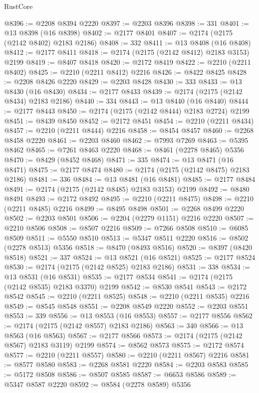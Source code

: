 \begin{lexlean}{RustCore}
\begin{coremodule}
@8396 := @2208 @8394 @2220
@8397 := @2203 @8396
@8398 := 331
@8401 := @13 @8398 (@16 @8398)
@8402 := @2177 @8401
@8407 := @2174 (@2175 (@2142 @8402) @2183 @2186)
@8408 := 332
@8411 := @13 @8408 (@16 @8408)
@8412 := @2177 @8411
@8418 := @2174 (@2175 (@2142 @8412) @2183 @3153) @2199
@8419 := @8407 @8418
@8420 := @2172 @8419
@8422 := @2210 (@2211 @8402)
@8425 := @2210 (@2211 @8412) @2216
@8426 := @8422 @8425
@8428 := @2208 @8426 @2220
@8429 := @2203 @8428
@8430 := 333
@8433 := @13 @8430 (@16 @8430)
@8434 := @2177 @8433
@8439 := @2174 (@2175 (@2142 @8434) @2183 @2186)
@8440 := 334
@8443 := @13 @8440 (@16 @8440)
@8444 := @2177 @8443
@8450 := @2174 (@2175 (@2142 @8444) @2183 @2724) @2199
@8451 := @8439 @8450
@8452 := @2172 @8451
@8454 := @2210 (@2211 @8434)
@8457 := @2210 (@2211 @8444) @2216
@8458 := @8454 @8457
@8460 := @2268 @8458 @2220
@8461 := @2203 @8460
@8462 := @7993 @7269
@8463 := @5395 @8462
@8465 := @7261 @8463 @2220
@8468 := @8461 (@2278 @8465) @5356
@8470 := @8429 (@8452 @8468)
@8471 := 335
@8474 := @13 @8471 (@16 @8471)
@8475 := @2177 @8474
@8480 := @2174 (@2175 (@2142 @8475) @2183 @2186)
@8481 := 336
@8484 := @13 @8481 (@16 @8481)
@8485 := @2177 @8484
@8491 := @2174 (@2175 (@2142 @8485) @2183 @3153) @2199
@8492 := @8480 @8491
@8493 := @2172 @8492
@8495 := @2210 (@2211 @8475)
@8498 := @2210 (@2211 @8485) @2216
@8499 := @8495 @8498
@8501 := @2268 @8499 @2220
@8502 := @2203 @8501
@8506 := @2204 (@2279 @1151) @2216 @2220
@8507 := @2210 @8506
@8508 := @8507 @2216
@8509 := @7266 @8508
@8510 := @6085 @8509
@8511 := @5550 @8510
@8513 := @5347 @8511 @2220
@8516 := @8502 (@2278 @8513) @5356
@8518 := @8470 (@8493 @8516)
@8520 := @8397 (@8420 @8518)
@8521 := 337
@8524 := @13 @8521 (@16 @8521)
@8525 := @2177 @8524
@8530 := @2174 (@2175 (@2142 @8525) @2183 @2186)
@8531 := 338
@8534 := @13 @8531 (@16 @8531)
@8535 := @2177 @8534
@8541 := @2174 (@2175 (@2142 @8535) @2183 @3370) @2199
@8542 := @8530 @8541
@8543 := @2172 @8542
@8545 := @2210 (@2211 @8525)
@8548 := @2210 (@2211 @8535) @2216
@8549 := @8545 @8548
@8551 := @2208 @8549 @2220
@8552 := @2203 @8551
@8553 := 339
@8556 := @13 @8553 (@16 @8553)
@8557 := @2177 @8556
@8562 := @2174 (@2175 (@2142 @8557) @2183 @2186)
@8563 := 340
@8566 := @13 @8563 (@16 @8563)
@8567 := @2177 @8566
@8573 := @2174 (@2175 (@2142 @8567) @2183 @3119) @2199
@8574 := @8562 @8573
@8575 := @2172 @8574
@8577 := @2210 (@2211 @8557)
@8580 := @2210 (@2211 @8567) @2216
@8581 := @8577 @8580
@8583 := @2268 @8581 @2220
@8584 := @2203 @8583
@8585 := @5172 @8508
@8586 := @8507 @8585
@8587 := @6653 @8586
@8589 := @5347 @8587 @2220
@8592 := @8584 (@2278 @8589) @5356

\end{coremodule}
\end{lexlean}
